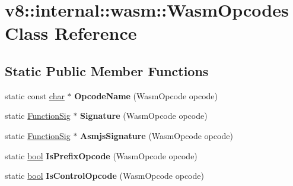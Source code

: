 \hypertarget{classv8_1_1internal_1_1wasm_1_1WasmOpcodes}{}\section{v8\+:\+:internal\+:\+:wasm\+:\+:Wasm\+Opcodes Class Reference}
\label{classv8_1_1internal_1_1wasm_1_1WasmOpcodes}
\subsection*{Static Public Member Functions}
\begin{DoxyCompactItemize}
\item 
\mbox{\label{classv8_1_1internal_1_1wasm_1_1WasmOpcodes_a0c0eac2b7fad842c77c26675d2823a37}} 
static const \mbox{\hyperlink{classchar}{char}} $\ast$ {\bfseries Opcode\+Name} (Wasm\+Opcode opcode)
\item 
\mbox{\label{classv8_1_1internal_1_1wasm_1_1WasmOpcodes_a48fb737c1a020d4d55183e679570c11e}} 
static \mbox{\hyperlink{classv8_1_1internal_1_1Signature}{Function\+Sig}} $\ast$ {\bfseries Signature} (Wasm\+Opcode opcode)
\item 
\mbox{\label{classv8_1_1internal_1_1wasm_1_1WasmOpcodes_aa4e6d6aca4ef0885c54c50aed79e5069}} 
static \mbox{\hyperlink{classv8_1_1internal_1_1Signature}{Function\+Sig}} $\ast$ {\bfseries Asmjs\+Signature} (Wasm\+Opcode opcode)
\item 
\mbox{\label{classv8_1_1internal_1_1wasm_1_1WasmOpcodes_aa44a49e81de01ab371812c9df7259e64}} 
static \mbox{\hyperlink{classbool}{bool}} {\bfseries Is\+Prefix\+Opcode} (Wasm\+Opcode opcode)
\item 
\mbox{\label{classv8_1_1internal_1_1wasm_1_1WasmOpcodes_ad10c03de6e146f6246b9df8e3786b2c7}} 
static \mbox{\hyperlink{classbool}{bool}} {\bfseries Is\+Control\+Opcode} (Wasm\+Opcode opcode)
\item 
\mbox{\label{classv8_1_1internal_1_1wasm_1_1WasmOpcodes_af490590f401fae2a3563edb9f8b72eb6}} 

\end{DoxyCompactItemize}
